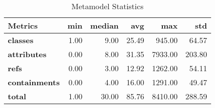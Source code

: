 \begin{table}[t]
\centering
\caption{Metamodel Statistics}
\label{tab:metamodelstats}
\footnotesize
\addtolength{\tabcolsep}{-2pt}
\begin{tabular}{lrrrrr}
\toprule
\textbf{Metrics} & min & median & avg & max & std \\
\midrule
\textbf{classes} & 1.00 & 9.00 & 25.49 & 945.00 & 64.57 \\
\textbf{attributes} & 0.00 & 8.00 & 31.35 & 7933.00 & 203.80 \\
\textbf{refs} & 0.00 & 3.00 & 12.92 & 1262.00 & 54.11 \\
\textbf{containments} & 0.00 & 4.00 & 16.00 & 1291.00 & 49.47 \\
\textbf{total} & 1.00 & 30.00 & 85.76 & 8410.00 & 288.59 \\
\bottomrule
\end{tabular}
\end{table}
